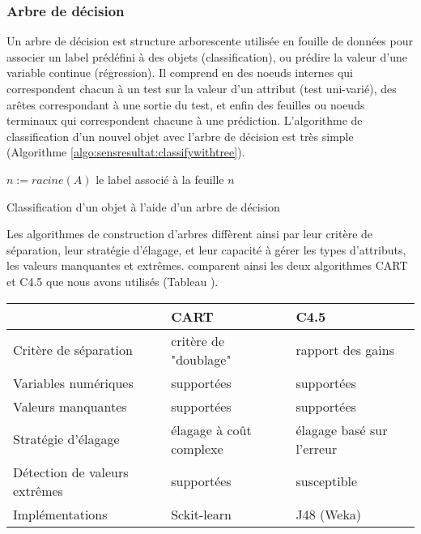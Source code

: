 \subsubsection{Arbre de décision}
Un arbre de décision est structure arborescente utilisée en fouille de données pour associer un label prédéfini à des objets (classification), ou prédire la valeur d'une variable continue (régression). Il comprend en des noeuds internes qui correspondent chacun à un test sur la valeur d'un attribut (test uni-varié), des arêtes correspondant à une sortie du test, et enfin des feuilles ou noeuds terminaux qui correspondent chacune à une prédiction. L'algorithme de classification d'un nouvel objet avec l'arbre de décision est très simple (Algorithme \ref{algo:sensresultat:classifywithtree}).

\begin{algorithm}[H] \small
	$n := racine(A)$ \; 
	\Return le label associé à la feuille $n$\;
	\caption{Classification d'un objet à l'aide d'un arbre de décision} \label{algo:sensresultat:classifywithtree}
\end{algorithm}

Les algorithmes de construction d'arbres diffèrent ainsi par leur critère de séparation, leur stratégie d'élagage, et leur capacité à gérer les types d'attributs, les valeurs manquantes et extrêmes. \citet{singh2014id3cartc45} comparent ainsi les deux algorithmes CART et C4.5 que nous avons utilisés (Tableau ).

\begin{table}
	\begin{tabular}{|p{3cm}|l|l|}
			\hline
	&	\textbf{CART} & \textbf{C4.5} \\ 
		\hline
		 Critère de séparation & critère de "doublage" & rapport des gains \\ 
		Variables numériques & supportées & supportées \\ 
		Valeurs manquantes & supportées & supportées \\  
		Stratégie d'élagage & élagage à coût complexe & élagage basé sur l'erreur \\  
		Détection de valeurs extrêmes & supportées & susceptible \\  
		Implémentations & Sckit-learn & J48 (Weka) \\ \hline
	\end{tabular}
\end{table}

